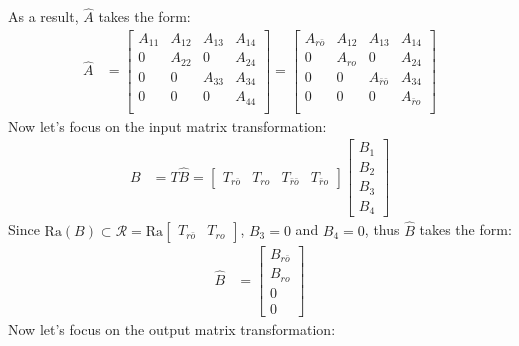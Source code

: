 \documentclass[twoside, 11pt, a4paper]{article}
\begin{document}
As a result, $\hat{A}$ takes the form:
%
\begin{align*}
    \hat{A} &= 
    \left[ \begin{array}{c|c|c|c} A_{11} & A_{12} & A_{13} & A_{14} \\ \hline 
    0 & A_{22} & 0 & A_{24} \\ \hline 
    0 & 0 & A_{33} & A_{34} \\ \hline 
    0 & 0 & 0 & A_{44} \\ 
    \end{array} \right] = 
    \left[ \begin{array}{c|c|c|c} A_{r\bar{o}} & A_{12} & A_{13} & A_{14} \\ \hline 
    0 & A_{ro} & 0 & A_{24} \\ \hline 
    0 & 0 & A_{\bar{r}\bar{o}} & A_{34} \\ \hline 
    0 & 0 & 0 & A_{\bar{r}o} \\ 
    \end{array} \right]
\end{align*}
%
Now let's focus on the input matrix transformation:
%
\begin{align*}
    B &= T \hat{B} = \left[ \begin{array}{c|c|c|c} T_{r\bar{o}} & T_{ro} & T_{\bar{r} \bar{o}} & T_{\bar{r} o} \end{array} \right] \left[ \begin{array}{c} B_1 \\ B_2 \\ B_3 \\ B_4 \end{array} \right]
\end{align*}
%
Since $\mathrm{Ra}(B) \subset \mathcal{R} =\mathrm{Ra}\left[ \begin{array}{c|c} T_{r\bar{o}} & T_{ro} \end{array} \right]$, $B_3 = 0$
and $B_4 = 0$, thus $\hat{B}$ takes the form:
\begin{align*}
    \hat{B} &= \left[ \begin{array}{c} B_{r\bar{o}} \\ B_{ro} \\ 0 \\ 0 \end{array} \right]
\end{align*}
%
Now let's focus on the output matrix transformation:
%
\end{document}
